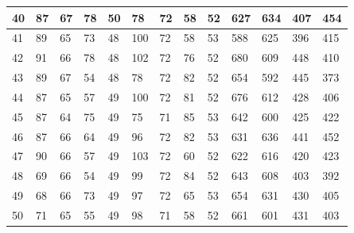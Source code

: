 \documentclass[legalpaper,12pt]{article}
\begin{document}
\begin{table}[h]
\begin{tabular}{|l|l|l|l|l|l|l|l|l|l|l|l|l|}
\\ \hline
40                                        & 87         & 67        & 78          & 50         & 78         & 72        & 58          & 52         & 627        & 634       & 407         & 454        \\ \hline
41                                        & 89         & 65        & 73          & 48         & 100        & 72        & 58          & 53         & 588        & 625       & 396         & 415        \\ \hline
42                                        & 91         & 66        & 78          & 48         & 102        & 72        & 76          & 52         & 680        & 609       & 448         & 410        \\ \hline
43                                        & 89         & 67        & 54          & 48         & 78         & 72        & 82          & 52         & 654        & 592       & 445         & 373        \\ \hline
44                                        & 87         & 65        & 57          & 49         & 100        & 72        & 81          & 52         & 676        & 612       & 428         & 406        \\ \hline
45                                        & 87         & 64        & 75          & 49         & 75         & 71        & 85          & 53         & 642        & 600       & 425         & 422        \\ \hline
46                                        & 87         & 66        & 64          & 49         & 96         & 72        & 82          & 53         & 631        & 636       & 441         & 452        \\ \hline
47                                        & 90         & 66        & 57          & 49         & 103        & 72        & 60          & 52         & 622        & 616       & 420         & 423        \\ \hline
48                                        & 69         & 66        & 54          & 49         & 99         & 72        & 84          & 52         & 643        & 608       & 403         & 392        \\ \hline
49                                        & 68         & 66        & 73          & 49         & 97         & 72        & 65          & 53         & 654        & 631       & 430         & 405        \\ \hline
50                                        & 71         & 65        & 55          & 49         & 98         & 71        & 58          & 52         & 661        & 601       & 431         & 403        \\ \hline

\end{tabular}
\end{table}
\end{document}
